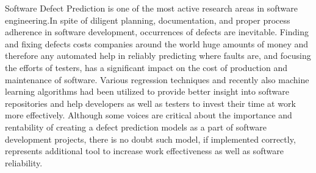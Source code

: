 Software Defect Prediction is one of the most active research areas in software engineering.In spite of diligent planning, documentation, and proper process adherence in software development, occurrences of defects are inevitable. Finding and fixing defects costs companies around the world huge amounts of money and therefore any automated help in reliably predicting where faults are, and focusing the efforts of testers, has a significant impact on the cost of production and maintenance of software. Various regression techniques and recently also machine learning algorithms had been utilized to provide better insight into software repositories and help developers as well as testers to invest their time at work more effectively. Although some voices are critical about the importance and rentability of creating a defect prediction models as a part of software development projects, there is no doubt such model, if implemented correctly, represents additional tool to increase work effectiveness as well as software reliability.
